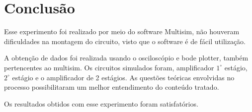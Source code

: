 \chapter{Conclus\~{a}o}
Esse experimento foi realizado por meio do software Multisim, não houveram dificuldades na montagem do circuito, visto que o software é de fácil utilização. 

A obtenção de dados foi realizada usando o osciloscópio e bode plotter, também pertencentes ao multisim. Os circuitos simulados foram, amplificador $ 1^\circ $ estágio, $2 ^\circ $ estágio e o amplificador de 2 estágios. As questões teóricas envolvidas no processo possibilitaram um melhor entendimento do conteúdo tratado. 


Os resultados obtidos com esse experimento foram satisfatórios.  
